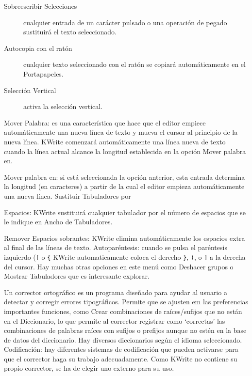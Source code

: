 \begin{description}
\begin{description}
\item  [Sobreescribir Selecciones]  cualquier entrada  de un  carácter
pulsado o una operación de pegado sustituirá el texto seleccionado.

\item [Autocopia  con el  ratón] cualquier  texto seleccionado  con el
ratón se copiará automáticamente en el Portapapeles.

\item [Selección Vertical] activa la selección vertical.

\end{description}

\item [Editar] 
\begin{description}

\item 

\item  Mover Palabra:  es una  característica que  hace que  el editor
empiece automáticamente una nueva línea de  texto y mueva el cursor al
principio de  la nueva  línea. {\sf KWrite}  comenzará automáticamente
una línea  nueva de texto cuando  la línea actual alcance  la longitud
establecida en la opción Mover palabra en.

\item Mover palabra en: si  está seleccionada la opción anterior, esta
entrada determina la  longitud (en caracteres) a partir de  la cual el
editor empieza automáticamente una  nueva línea. Sustituir Tabuladores
por

\item  Espacios: {\sf  KWrite} sustituirá  cualquier tabulador  por el
número de espacios que se le indique en Ancho de Tabuladores.

\item Remover Espacios sobrantes: {\sf KWrite} elimina automáticamente
los espacios  extra al final  de las líneas de  texto. Autoparéntesis:
cuando  se pulsa  el paréntesis  izquierdo (\verb|[|  o \verb|{|  {\sf
KWrite}  automaticamente  coloca  el  derecho  \verb|}|,  \verb|)|,  o
\verb|]| a  la derecha del cursor.  Hay muchas otras opciones  en este
menú como  Deshacer grupos  o Mostrar  Tabuladores que  es interesante
explorar.

\end{description}

\item [Ortografía]  Un corrector  ortográfico es un  programa diseñado
para ayudar  al usuario  a detectar  y corregir  errores tipográficos.
Permite  que se  ajusten  em las  preferencias importantes  funciones,
como  Crear  combinaciones  de  raíces/sufijos  que  no  están  en  el
Diccionario, lo  que permite  al corrector registrar  como `correctas'
las combinaciones de palabras raíces  con sufijos o prefijos aunque no
estén en la  base de datos del diccionario.  Hay diversos diccionarios
según  el idioma  seleccionado.\\ {\sf  Codificación:} hay  diferentes
sistemas de  codificación que pueden  activarse para que  el corrector
haga su trabajo adecuadamente. Como {\sf KWrite} no contiene su propio
corrector, se ha de elegir uno externo para su uso.


\end{description}
